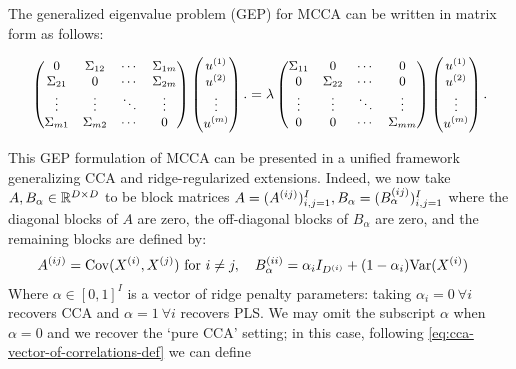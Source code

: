 The generalized eigenvalue problem (GEP) for MCCA can be written in matrix form as follows:

\begin{align}
    \small
    \begin{pmatrix}
        0           & \Sigma_{12} & \cdots & \Sigma_{1m} \\
        \Sigma_{21} & 0           & \cdots & \Sigma_{2m} \\
        \vdots      & \vdots      & \ddots & \vdots      \\
        \Sigma_{m1} & \Sigma_{m2} & \cdots & 0
    \end{pmatrix}
    \begin{pmatrix}
        u^{(1)} \\
        u^{(2)} \\
        \vdots   \\
        u^{(m)}
    \end{pmatrix}.
    =
    \lambda
    \begin{pmatrix}
        \Sigma_{11} & 0           & \cdots & 0           \\
        0           & \Sigma_{22} & \cdots & 0           \\
        \vdots      & \vdots      & \ddots & \vdots      \\
        0           & 0           & \cdots & \Sigma_{mm}
    \end{pmatrix}
    \begin{pmatrix}
        u^{(1)} \\
        u^{(2)} \\
        \vdots   \\
        u^{(m)}
    \end{pmatrix}.
\end{align}

This GEP formulation of MCCA can be presented in a unified framework generalizing CCA and ridge-regularized extensions. Indeed, we now take $A,B_\alpha \in \mathbb{R}^{D \times D}$ to be block matrices $A = (A^{(ij)})_{i,j=1}^I, B_\alpha = (B_\alpha^{(ij)})_{i,j=1}^I$ where the diagonal blocks of $A$ are zero, the off-diagonal blocks of $B_\alpha$ are zero, and the remaining blocks are defined by:
\begin{align}
    \label{eq:gep-most-general-formulation}%
    A^{(ij)} &= \Cov(X\sps{i}, X\sps{j}) \text{ for } i \neq j, \quad %
    B_\alpha^{(ii)} = \alpha_i I_{D\sps{i}} + (1-\alpha_i) \Var(X\sps{i})  %
\end{align}
Where $\alpha \in [0,1]^I$ is a vector of ridge penalty parameters: taking $\alpha_i = 0 \: \forall i$ recovers CCA and $\alpha = 1 \: \forall i$ recovers PLS.
We may omit the subscript $\alpha$ when $\alpha=0$ and we recover the `pure CCA' setting; in this case, following \ref{eq:cca-vector-of-correlations-def} we can define

